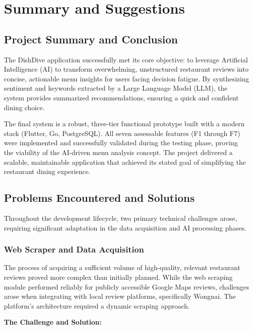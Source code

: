 \chapter{Summary and Suggestions}

\section{Project Summary and Conclusion}

The DishDive application successfully met its core objective: to leverage Artificial Intelligence (AI) to transform overwhelming, unstructured restaurant reviews into concise, actionable menu insights for users facing decision fatigue. By synthesizing sentiment and keywords extracted by a Large Language Model (LLM), the system provides summarized recommendations, ensuring a quick and confident dining choice.

The final system is a robust, three-tier functional prototype built with a modern stack (Flutter, Go, PostgreSQL). All seven assessable features (F1 through F7) were implemented and successfully validated during the testing phase, proving the viability of the AI-driven menu analysis concept. The project delivered a scalable, maintainable application that achieved its stated goal of simplifying the restaurant dining experience.

\section{Problems Encountered and Solutions}

Throughout the development lifecycle, two primary technical challenges arose, requiring significant adaptation in the data acquisition and AI processing phases.

\subsection{Web Scraper and Data Acquisition}

The process of acquiring a sufficient volume of high-quality, relevant restaurant reviews proved more complex than initially planned. While the web scraping module performed reliably for publicly accessible Google Maps reviews, challenges arose when integrating with local review platforms, specifically Wongnai. The platform’s architecture required a dynamic scraping approach.

\textbf{The Challenge and Solution:}

